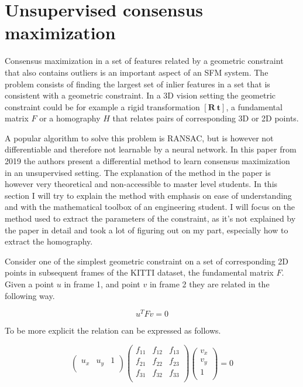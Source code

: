 \section{Unsupervised consensus maximization}

Consensus maximization in a set of features related by a geometric constraint that also contains outliers is an important aspect of an SFM system. The problem consists of finding the largest set of inlier features in a set that is consistent with a geometric constraint. In a 3D vision setting the geometric constraint could be for example a rigid transformation $[\textbf{R}\ \textbf{t}]$, a fundamental matrix $F$ or a homography $H$ that relates pairs of corresponding 3D or 2D points.

A popular algorithm to solve this problem is RANSAC\cite{ransac}, but is however not differentiable and therefore not learnable by a neural network. In this paper\cite{consensus} from 2019 the authors present a differential method to learn consensus maximization in an unsupervised setting. The explanation  of the method in the paper is however very theoretical and non-accessible to master level students. In this section I will try to explain the method with emphasis on ease of understanding and with the mathematical toolbox of an engineering student. I will focus on the method used to extract the parameters of the constraint, as it's not explained by the paper in detail and took a lot of figuring out on my part, especially how to extract the homography.

Consider one of the simplest geometric constraint on a set of corresponding 2D points in subsequent frames of the KITTI dataset, the fundamental matrix $F$. Given a point $u$ in frame 1, and point $v$ in frame 2 they are related in the following way.

 \[
 u^T F v = 0
 \]
 
 To be more explicit the relation can be expressed as follows.
 
\[
\begin{pmatrix}
u_x & u_y & 1 \\
\end{pmatrix}
\begin{pmatrix}
f_{11} & f_{12} & f_{13} \\
f_{21} & f_{22} & f_{23} \\
f_{31} & f_{32} & f_{33} \\
\end{pmatrix}
\begin{pmatrix}
v_x \\
v_y \\
1 \\
\end{pmatrix}
= 0
\]

